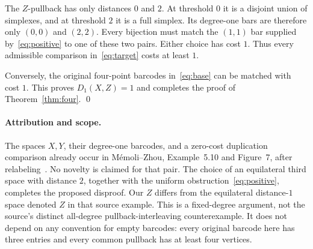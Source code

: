 \documentclass[11pt]{article}
\theoremstyle{remark}
\begin{document}
The $Z$-pullback has only distances $0$ and $2$. At threshold $0$ it is a
disjoint union of simplexes, and at threshold $2$ it is a full simplex.
Its degree-one bars are therefore only $(0,0)$ and $(2,2)$.
Every bijection must match the $(1,1)$ bar supplied by~\eqref{eq:positive}
to one of these two pairs. Either choice has cost $1$.
Thus every admissible comparison in~\eqref{eq:target} costs at least $1$.

Conversely, the original four-point barcodes in~\eqref{eq:base} can be
matched with cost $1$. This proves $D_1(X,Z)=1$ and completes the proof of
Theorem~\ref{thm:four}.
\qed

\paragraph{Attribution and scope.}
The spaces $X,Y$, their degree-one barcodes, and a zero-cost duplication
comparison already occur in M\'emoli--Zhou, Example~5.10 and Figure~7,
after relabeling~\cite{mz}. No novelty is claimed for that pair. The choice
of an equilateral third space with distance $2$, together with the
uniform obstruction~\eqref{eq:positive}, completes the proposed disproof.
Our $Z$ differs from the equilateral distance-$1$ space denoted $Z$ in
that source example.
This is a fixed-degree argument, not the source's distinct all-degree
pullback-interleaving counterexample. It does not depend on any convention
for empty barcodes: every original barcode here has three entries and
every common pullback has at least four vertices.
\end{document}
